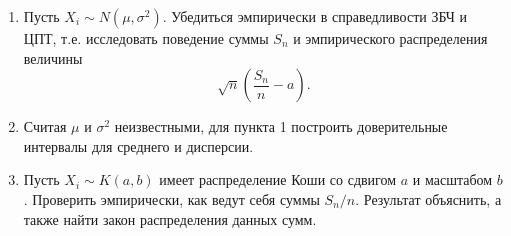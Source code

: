 \begin{enumerate}
	\item Пусть $X_i \sim N(\mu, \sigma^2)$. Убедиться эмпирически в справедливости
     ЗБЧ и ЦПТ, т.е. исследовать поведение суммы $S_n$ и эмпирического распределения
     величины
	\begin{equation*}
	\sqrt{n} \left( \frac{S_n}{n} - a \right).
	\end{equation*}
	\item Считая $ \mu $ и $ \sigma^2 $ неизвестными, для пункта 1 построить
     доверительные интервалы для среднего и дисперсии.
	\item Пусть $ X_i \sim K(a, b) $ имеет распределение Коши со сдвигом $ a $ и
     масштабом $ b $. Проверить эмпирически, как ведут себя суммы $S_n/n$.
     Результат объяснить, а также найти закон распределения данных сумм.
\end{enumerate}

